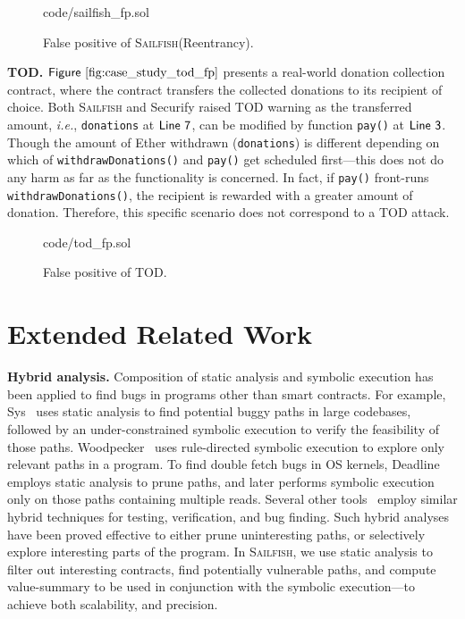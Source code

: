 \documentclass[conference, romanappendices]{tex/IEEEtran}
\theoremstyle{bfnote}
\newcommand{\toolname}{\textsc{Sailfish}\xspace}
\newcommand{\securify}{{\sc Securify}\xspace}
\newcommand{\sys}{{\sc Sys}\xspace}
\newcommand{\woodpecker}{{\sc Woodpecker}\xspace}
\newcommand{\deadline}{{\sc Deadline}\xspace}
\newcommand{\smart}{smart contract}
\newcommand{\ether}{{Ether}\xspace}
\newcommand{\ie}{\textit{i.e.}}
\newcommand{\Line}[1]{\ensuremath{\sf Line~ #1}}
\newcommand{\Fig}[1]{\ensuremath{\sf Figure~\ref{#1}}}
\begin{document}
\begin{figure}[h]
	\vspace{-5.5mm}
	
	{code/sailfish_fp.sol}
	\vspace{-6mm}
	\caption{False positive of \toolname (Reentrancy).
		}
	\label{fig:case_study_reentrancy_fp}
	\vspace{-4mm}
\end{figure}

\noindent
\textbf{TOD.} \Fig{fig:case_study_tod_fp} presents a real-world donation collection contract, where the contract transfers the collected donations to its recipient of choice.
Both \toolname and \securify raised TOD warning as the transferred amount, \ie, \texttt{donations} at \Line{7}, can be modified by function \texttt{pay()} at \Line{3}.
Though the amount of \ether withdrawn (\texttt{donations}) is different depending on which of \texttt{withdrawDonations()} and \texttt{pay()} get scheduled first---this does not do any harm as far as the functionality is concerned.
In fact, if \texttt{pay()} front-runs \texttt{withdrawDonations()}, the recipient is rewarded with a greater amount of donation.
Therefore, this specific scenario does not correspond to a TOD attack. 

\begin{figure}[h]
	\vspace{-5.5mm}
	
	{code/tod_fp.sol}
	\vspace{-0.22in}
	\caption{False positive of TOD.
		}
	\label{fig:case_study_tod_fp}
	\vspace{-5mm}
\end{figure}


\section{Extended Related Work}
\label{app:extended_related_work}
\noindent
\textbf{Hybrid analysis.}
Composition of static analysis and symbolic execution has been applied to find bugs in programs other than \smart s.
For example, \sys~\cite{Fraser20} uses static analysis to find potential buggy paths in large codebases, followed by an under-constrained symbolic execution to verify the feasibility of those paths.
\woodpecker~\cite{Heming13} uses rule-directed symbolic execution to explore only relevant paths in a program.
To find double fetch bugs in OS kernels, \deadline~\cite{Meng18} employs static analysis to prune paths, and later performs symbolic execution only on those paths containing multiple reads.
Several other tools~\cite{Domagoj11,Josselin16, Gerasimov18,Shengjian15,Shengjian16} employ similar hybrid techniques for testing, verification, and bug finding.
Such hybrid analyses have been proved effective to either prune uninteresting paths, or selectively explore interesting parts of the program.
In \toolname, we use static analysis to filter out interesting contracts, find potentially vulnerable paths, and compute value-summary to be used in conjunction with the symbolic execution---to achieve both scalability, and precision.
\end{document}
